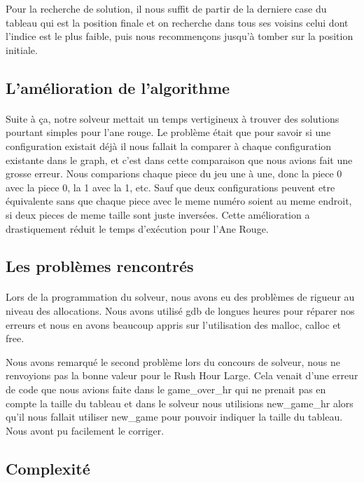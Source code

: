 \documentclass {article}
\begin{document}
Pour la recherche de solution, il nous suffit de partir de la derniere case du tableau qui est la position finale et on recherche dans tous ses voisins celui dont l'indice est le plus faible, puis nous recommençons jusqu'à tomber sur la position initiale.

\subsection{L'amélioration de l'algorithme}
\paragraph{}
Suite à ça, notre solveur mettait un temps vertigineux à trouver des solutions pourtant simples pour l'ane rouge. Le problème était que pour savoir si une configuration existait déjà il nous fallait la comparer à chaque configuration existante dans le graph, et c'est dans cette comparaison que nous avions fait une grosse erreur. Nous comparions chaque piece du jeu une à une, donc la piece 0 avec la piece 0, la 1 avec la 1, etc. Sauf que deux configurations peuvent etre équivalente sans que chaque piece avec le meme numéro soient au meme endroit, si deux pieces de meme taille sont juste inversées. Cette amélioration a drastiquement réduit le temps d'exécution pour l'Ane Rouge.

\subsection{Les problèmes rencontrés}
\paragraph{}
Lors de la programmation du solveur, nous avons eu des problèmes de rigueur au niveau des allocations. Nous avons utilisé gdb de longues heures pour réparer nos erreurs et nous en avons beaucoup appris sur l'utilisation des malloc, calloc et free.

Nous avons remarqué le second problème lors du concours de solveur, nous ne renvoyions pas la bonne valeur pour le Rush Hour Large. Cela venait d'une erreur de code que nous avions faite dans le game\_over\_hr qui ne prenait pas en compte la taille du tableau et dans le solveur nous utilisions new\_game\_hr alors qu'il nous fallait utiliser new\_game pour pouvoir indiquer la taille du tableau. Nous avont pu facilement le corriger.

\subsection{Complexité}
\end{document}
